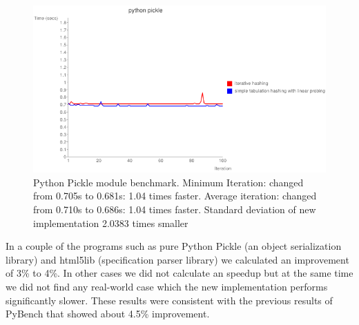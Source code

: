 \documentclass[11pt]{article}
\begin{document}
\begin{figure}[H]
  \centering
  \includegraphics[width=12cm]{slowpickle.png}
  \caption{Python Pickle module benchmark. Minimum Iteration: changed from 0.705s to 0.681s: 1.04 times faster. Average iteration: changed from 0.710s to 0.686s: 1.04 times faster. Standard deviation of new implementation 2.0383 times smaller}
\end{figure}



In a couple of the programs such as pure Python Pickle (an object serialization
library) and html5lib (specification parser library) we calculated an
improvement of 3\% to 4\%. In other cases we did not calculate an speedup but
at the same time we did not find any real-world case which the new
implementation performs significantly slower. These results were consistent
with the previous results of PyBench that showed about 4.5\% improvement.
 
\end{document}
